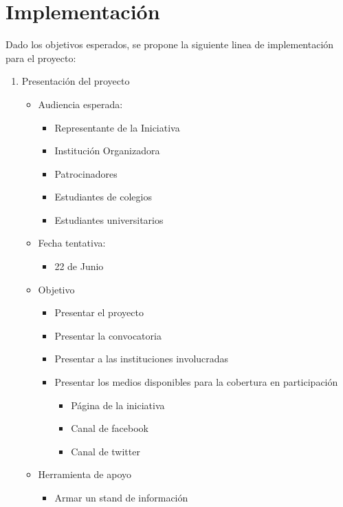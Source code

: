 \documentclass{article}
\begin{document}
\section{Implementación}

Dado los objetivos esperados, se propone la siguiente linea de implementación para el proyecto:

\begin{enumerate}
\item Presentación del proyecto
\begin{itemize}
\item Audiencia esperada:
\begin{itemize}
\item Representante de la Iniciativa
\item Institución Organizadora
\item Patrocinadores
\item Estudiantes de colegios
\item Estudiantes universitarios
\end{itemize}
\item Fecha tentativa:
\begin{itemize}
\item 22 de Junio
\end{itemize}
\item Objetivo
\begin{itemize}
\item Presentar el proyecto
\item Presentar la convocatoria
\item Presentar a las instituciones involucradas
\item Presentar los medios disponibles para la cobertura en participación
\begin{itemize}
\item Página de la iniciativa 
\item Canal de facebook
\item Canal de twitter
\end{itemize}
\end{itemize}
\item Herramienta de apoyo
\begin{itemize}
\item Armar un stand de información
\end{itemize}
\end{itemize}


\end{enumerate}
\end{document}
